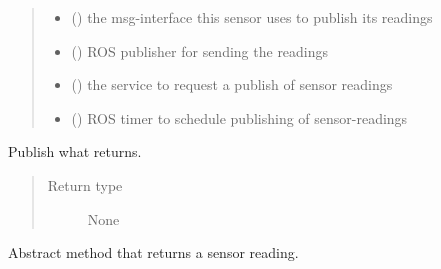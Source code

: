 \documentclass[a4paper,12pt,english]{article}
\begin{document}
\begin{fulllineitems}
\begin{quote}
\begin{description}
\begin{itemize}
\item {} 
 () \textendash{} the msg-interface this sensor uses to publish its
readings

\item {} 
 () \textendash{} ROS publisher for sending the readings

\item {} 
 () \textendash{} the service to request a publish of sensor readings

\item {} 
 () \textendash{} ROS timer to schedule publishing of sensor-readings

\end{itemize}

\end{description}\end{quote}

\begin{fulllineitems}
\label{\detokenize{osbk_devices:osbk_devices.sensor_base.SensorBase.publish_reading}}
Publish what  returns.
\begin{quote}\begin{description}
\item[{Return type}] \leavevmode
None

\end{description}\end{quote}

\end{fulllineitems}


\begin{fulllineitems}
\label{\detokenize{osbk_devices:osbk_devices.sensor_base.SensorBase.read_sensor}}
Abstract method that returns a sensor reading.


\end{fulllineitems}
\end{fulllineitems}
\end{document}
